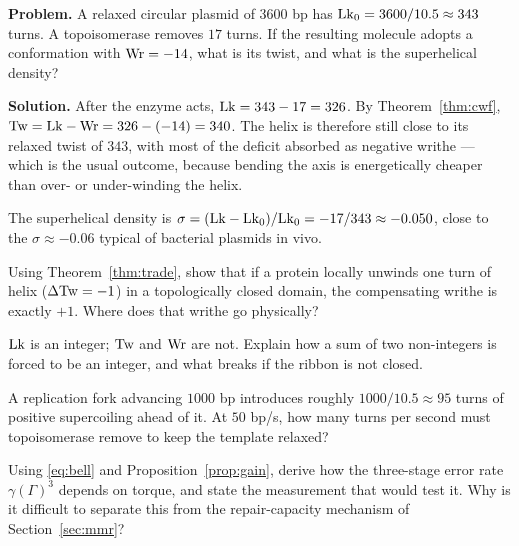 \begin{worked}
\textbf{Problem.} A relaxed circular plasmid of $3600$ bp has $\mathrm{Lk}_0 = 3600/10.5
\approx 343$ turns. A topoisomerase removes $17$ turns. If the resulting molecule
adopts a conformation with $\mathrm{Wr} = -14$, what is its twist, and what is the
superhelical density?

\textbf{Solution.} After the enzyme acts, $\mathrm{Lk} = 343 - 17 = 326$. By
Theorem~\ref{thm:cwf}, $\mathrm{Tw} = \mathrm{Lk} - \mathrm{Wr} = 326 - (-14) = 340$. The helix is
therefore still close to its relaxed twist of $343$, with most of the deficit
absorbed as negative writhe --- which is the usual outcome, because bending the
axis is energetically cheaper than over- or under-winding the helix.

The superhelical density is
$\sigma = (\mathrm{Lk} - \mathrm{Lk}_0)/\mathrm{Lk}_0 = -17/343 \approx -0.050$, close to the $\sigma
\approx -0.06$ typical of bacterial plasmids in vivo.
\end{worked}

\begin{exercise}
Using Theorem~\ref{thm:trade}, show that if a protein locally unwinds one turn of
helix ($\Delta\mathrm{Tw} = -1$) in a topologically closed domain, the compensating
writhe is exactly $+1$. Where does that writhe go physically?
\end{exercise}

\begin{exercise}
$\mathrm{Lk}$ is an integer; $\mathrm{Tw}$ and $\mathrm{Wr}$ are not. Explain how a sum of two
non-integers is forced to be an integer, and what breaks if the ribbon is not
closed.
\end{exercise}

\begin{exercise}
A replication fork advancing $1000$ bp introduces roughly $1000/10.5 \approx 95$
turns of positive supercoiling ahead of it. At $50$ bp/s, how many turns per
second must topoisomerase remove to keep the template relaxed?
\end{exercise}

\begin{exercise}[(harder)]
Using \eqref{eq:bell} and Proposition~\ref{prop:gain}, derive how the three-stage
error rate $\gamma(\Gamma)^3$ depends on torque, and state the measurement that
would test it. Why is it difficult to separate this from the repair-capacity
mechanism of Section~\ref{sec:mmr}?
\end{exercise}

